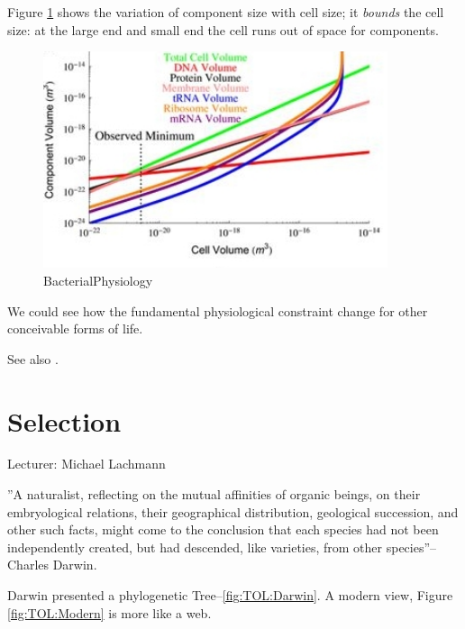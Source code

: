 \documentclass[]{article}
\begin{document}
Figure \ref{fig:BacterialPhysiology} shows the variation of component size with cell size\cite{kempes2016evolutionary}; it \textit{bounds} the cell size: at the large end and small end the cell runs out of space for components.

\begin{figure}[H]
	\caption{BacterialPhysiology}\label{fig:BacterialPhysiology}
	\includegraphics[width=0.9\textwidth]{BacterialPhysiology}
\end{figure}

We could see how the fundamental physiological constraint change for other conceivable forms of life.

See also \cite{kempes2011predicting}.

\section{Selection}

Lecturer: Michael Lachmann

''A naturalist, reflecting on the mutual affinities of organic beings, on their embryological relations, their geographical distribution, geological succession, and other such facts, might come to the conclusion that each species had not been independently created, but had descended, like varieties, from other  species''--Charles Darwin\cite{darwin1859origin}.

Darwin\cite{darwin1859origin} presented a phylogenetic Tree--\ref{fig:TOL:Darwin}. A modern view, Figure \ref{fig:TOL:Modern} is more like a web.
\end{document}
